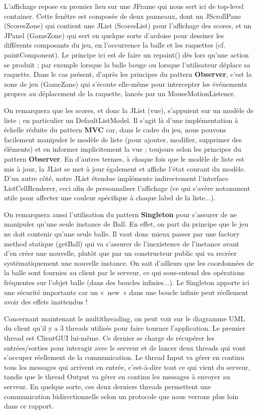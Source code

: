 \documentclass[a4paper,12pt]{article}
\begin{document}
L'affichage repose en premier lieu sur une JFrame qui nous sert ici de top-level container. Cette fenêtre est composée de deux panneaux, dont un JScrollPane (ScoresZone) qui contient une JList (ScoresList) pour l'affichage des scores, et un JPanel (GameZone) qui sert en quelque sorte d'ardoise pour dessiner les différents composants du jeu, en l'occurrence la balle et les raquettes (cf. paintComponent). Le principe ici est de faire un repaint() dès lors qu'une action se produit ; par exemple lorsque la balle bouge ou lorsque l'utilisateur déplace sa raquette. Dans le cas présent, d'après les principes du pattern \textbf{Observer}, c'est la zone de jeu (GameZone) qui s'écoute elle-même pour intercepter les événements propres au déplacement de la raquette, lancés par un MouseMotionListener.

On remarquera que les scores, et donc la JList (vue), s'appuient sur un modèle de liste ; en particulier un DefaultListModel. Il s'agit là d'une implémentation à échelle réduite du pattern \textbf{MVC} car, dans le cadre du jeu, nous pouvons facilement manipuler le modèle de liste (pour ajouter, modifier, supprimer des éléments) et en informer implicitement la vue ; toujours selon les principes du pattern \textbf{Observer}. En d'autres termes, à chaque fois que le modèle de liste est mis à jour, la JList se met à jour également et affiche l'état courant du modèle. D'un autre côté, notre JList étendue implémente indirectement l'interface ListCellRenderer, ceci afin de personnaliser l'affichage (ce qui s'avère notamment utile pour affecter une couleur spécifique à chaque label de la liste...).

On remarquera aussi l'utilisation du pattern \textbf{Singleton} pour s'assurer de ne manipuler qu'une seule instance de Ball. En effet, on part du principe que le jeu ne doit contenir qu'une seule balle. Il vaut donc mieux passer par une factory method statique (getBall) qui va s'assurer de l'inexistence de l'instance avant d'en créer une nouvelle, plutôt que par un constructeur public qui va recréer systématiquement une nouvelle instance. On sait d'ailleurs que les coordonnées de la balle sont fournies au client par le serveur, ce qui sous-entend des opérations fréquentes sur l'objet balle (dans des boucles infinies...). Le Singleton apporte ici une sécurité importante car un «~new~» dans une boucle infinie peut réellement avoir des effets inattendus !

Concernant maintenant le multithreading, on peut voir sur le diagramme UML du client qu'il y a 3 threads utilisés pour faire tourner l'application. Le premier thread est ClientGUI lui-même. Ce dernier se charge de récupérer les entrées/sorties pour interagir avec le serveur et de lancer deux threads qui vont s'occuper réellement de la communication. Le thread Input va gérer en continu tous les messages qui arrivent en entrée, c'est-à-dire tout ce qui vient du serveur, tandis que le thread Output va gérer en continu les messages à envoyer au serveur. En quelque sorte, ces deux derniers threads permettent une communication bidirectionnelle selon un protocole que nous verrons plus loin dans ce rapport.
\end{document}
